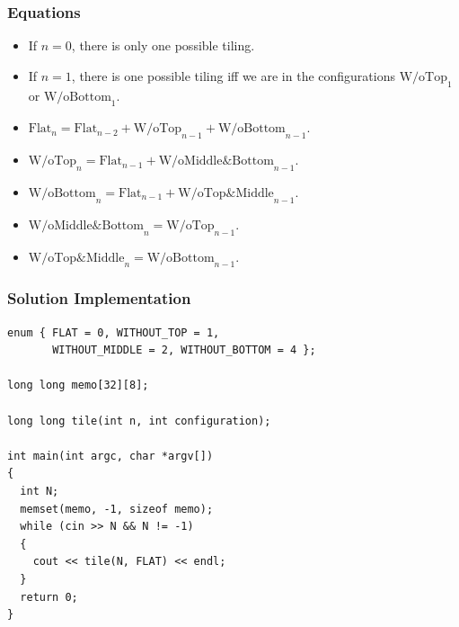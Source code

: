 \documentclass{beamer}
\begin{document}
\begin{frame}%
\frametitle{Equations}


\begin{itemize}

\item If $n = 0$, there is only one possible tiling.

\vspace{0.4cm}

\item<2-> If $n = 1$, there is one possible tiling iff we are in the configurations $\text{W/oTop}_1$ or $\text{W/oBottom}_1$.

\vspace{0.4cm}

\item<3-> $\text{Flat}_n = \text{Flat}_{n-2} + \text{W/oTop}_{n-1} + \text{W/oBottom}_{n-1}$.

\vspace{0.4cm}

\item<4-> $\text{W/oTop}_{n} = \text{Flat}_{n-1} + \text{W/oMiddle\&Bottom}_{n-1}$.

\vspace{0.4cm}

\item<5-> $\text{W/oBottom}_{n} = \text{Flat}_{n-1} + \text{W/oTop\&Middle}_{n-1}$.

\vspace{0.4cm}

\item<6-> $\text{W/oMiddle\&Bottom}_{n} = \text{W/oTop}_{n-1}$.

\vspace{0.4cm}

\item<7-> $\text{W/oTop\&Middle}_{n} = \text{W/oBottom}_{n-1}$.

\end{itemize}

\end{frame}

\begin{frame}[containsverbatim]
\frametitle{Solution Implementation}

\scriptsize
\begin{lstlisting}
enum { FLAT = 0, WITHOUT_TOP = 1,
       WITHOUT_MIDDLE = 2, WITHOUT_BOTTOM = 4 };

long long memo[32][8];

long long tile(int n, int configuration);

int main(int argc, char *argv[])
{
  int N;
  memset(memo, -1, sizeof memo);
  while (cin >> N && N != -1)
  {
    cout << tile(N, FLAT) << endl;
  }
  return 0;
}
\end{lstlisting}

\end{frame}
\end{document}
